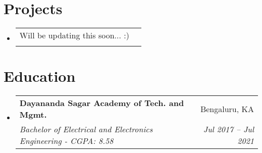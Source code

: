 \documentclass[letterpaper,11pt]{article}
\makeatletter
\newcommand{\resumeItem}[1]{
  \item\small{
    {#1 \vspace{-2pt}}
  }
}
\newcommand{\resumeSubheading}[4]{
  \vspace{-2pt}\item
    \begin{tabular*}{0.97\textwidth}[t]{l@{\extracolsep{\fill}}r}
      \textbf{#1} & #2 \\
      \textit{\small#3} & \textit{\small #4} \\
    \end{tabular*}\vspace{-7pt}
}
\newcommand{\resumeProjectHeading}[2]{
    \item
    \begin{tabular*}{0.97\textwidth}{l@{\extracolsep{\fill}}r}
      \small#1 & #2 \\
    \end{tabular*}\vspace{-7pt}
}
\newcommand{\resumeSubHeadingListStart}{\begin{itemize}[leftmargin=0.15in, label={}]}
\newcommand{\resumeSubHeadingListEnd}{\end{itemize}}
\newcommand{\resumeItemListStart}{\begin{itemize}}
\newcommand{\resumeItemListEnd}{\end{itemize}\vspace{-5pt}}
\makeatother
\begin{document}
\section{Projects}
\resumeSubHeadingListStart \resumeProjectHeading
{Will be updating this soon... :)}\\
\resumeSubHeadingListEnd


\section{Education}
\resumeSubHeadingListStart \resumeSubheading
{Dayananda Sagar Academy of Tech. and Mgmt.}{Bengaluru, KA} {Bachelor of Electrical and Electronics Engineering - CGPA: 8.58}{Jul 2017 -- Jul 2021}
\resumeSubHeadingListEnd

%
\end{document}
